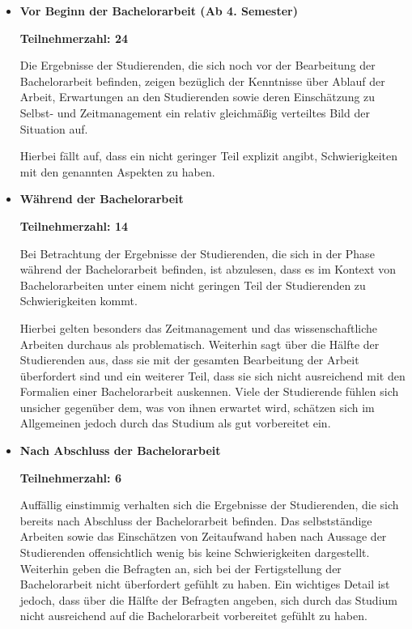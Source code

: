 \documentclass[bibliography=totoc,listof=totoc,BCOR=5mm,DIV=12,oneside]{scrbook}
\begin{document}
\begin{itemize}
\item \textbf{Vor Beginn der Bachelorarbeit (Ab 4. Semester)}
\par \textbf{Teilnehmerzahl: 24}
\par Die Ergebnisse der Studierenden, die sich noch vor der Bearbeitung der Bachelorarbeit befinden, zeigen bezüglich der Kenntnisse über Ablauf der Arbeit, Erwartungen an den Studierenden sowie deren Einschätzung zu Selbst- und Zeitmanagement ein relativ gleichmäßig verteiltes Bild der Situation auf. 
\par Hierbei fällt auf, dass ein nicht geringer Teil explizit angibt, Schwierigkeiten mit den genannten Aspekten zu haben. 

\item \textbf{Während der Bachelorarbeit}
\par \textbf{Teilnehmerzahl: 14}
\par Bei Betrachtung der Ergebnisse der Studierenden, die sich in der Phase während der Bachelorarbeit befinden, ist abzulesen, dass es im Kontext von Bachelorarbeiten unter einem nicht geringen Teil der Studierenden zu Schwierigkeiten kommt. 
\par Hierbei gelten besonders das Zeitmanagement und das wissenschaftliche Arbeiten durchaus als problematisch. Weiterhin sagt über die Hälfte der Studierenden aus, dass sie mit der gesamten Bearbeitung der Arbeit überfordert sind und ein weiterer Teil, dass sie sich nicht ausreichend mit den Formalien einer Bachelorarbeit auskennen. Viele der Studierende fühlen sich unsicher gegenüber dem, was von ihnen erwartet wird, schätzen sich im Allgemeinen jedoch durch das Studium als gut vorbereitet ein.

\item \textbf{Nach Abschluss der Bachelorarbeit}
\par \textbf{Teilnehmerzahl: 6}
\par Auffällig einstimmig verhalten sich die Ergebnisse der Studierenden, die sich bereits nach Abschluss der Bachelorarbeit befinden. Das selbstständige Arbeiten sowie das Einschätzen von Zeitaufwand haben nach Aussage der Studierenden offensichtlich wenig bis keine Schwierigkeiten dargestellt. Weiterhin geben die Befragten an, sich bei der Fertigstellung der Bachelorarbeit nicht überfordert gefühlt zu haben. Ein wichtiges Detail ist jedoch, dass über die Hälfte der Befragten angeben, sich durch das Studium nicht ausreichend auf die Bachelorarbeit vorbereitet gefühlt zu haben. 
\end{itemize}
\end{document}
